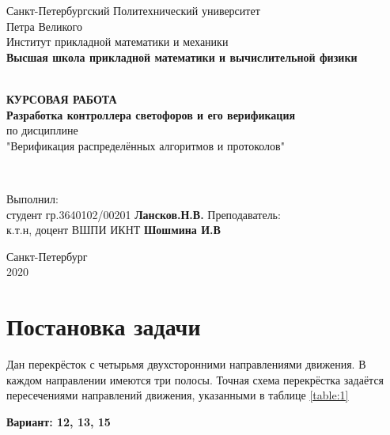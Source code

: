 \documentclass[12pt]{article}
\renewcommand{\listoffigures}{\begingroup  %
\tocsection
\tocfile{\listfigurename}{lof}
\endgroup}
\renewcommand{\listoftables}{\begingroup  %
\tocsection
\tocfile{\listtablename}{lot}
\endgroup}
\begin{document}
\begin{titlepage}
	\center
		Санкт-Петербургский Политехнический
		университет \\ Петра Великого\\
		Институт прикладной математики и механики
		\\ \textbf{Высшая школа прикладной математики и вычислительной физики}

	\vfill ~
	\textbf{
		\\ \large КУРСОВАЯ РАБОТА \\
        Разработка контроллера светофоров и его верификация
	}
	\\ по дисциплине
	\\ "Верификация распределённых алгоритмов и протоколов"

	\vfill ~

    \begin{flushleft}
    Выполнил: \\ студент гр.3640102/00201  \hspace{\fill} \textbf{Лансков.Н.В.} \linebreak[4]
    Преподаватель: \\ к.т.н, доцент ВШПИ ИКНТ \hspace{\fill} \textbf{Шошмина И.В} \\
    \end{flushleft}

\vfill

{\large}	Санкт-Петербург
\\ 2020
\end{titlepage}

\tableofcontents 
\listoffigures
\listoftables
\newpage

\section{Постановка задачи}

Дан перекрёсток с четырьмя двухсторонними направлениями движения. В каждом направлении имеются
три полосы. Точная схема перекрёстка задаётся пересечениями направлений движения, указанными 
в таблице \ref{table:1}

\textbf{Вариант: 12, 13, 15}
\end{document}

